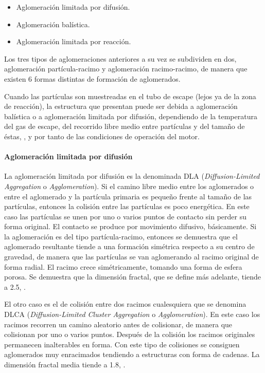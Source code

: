 \begin{itemize}
	\item Aglomeración limitada por difusión.
	\item Aglomeración balística.
	\item Aglomeración limitada por reacción.
\end{itemize}

\par Los tres tipos de aglomeraciones anteriores a su vez se subdividen en dos, aglomeración partícula-racimo y aglomeración racimo-racimo, de manera que existen 6 formas distintas de formación de aglomerados.

\par Cuando las partículas son muestreadas en el tubo de escape (lejos ya de la zona de reacción), la estructura que presentan puede ser debida a aglomeración balística o a aglomeración limitada por difusión, dependiendo de la temperatura del gas de escape, del recorrido libre medio entre partículas y del tamaño de éstas, \cite{skillasetal:1998}, y por tanto de las condiciones de operación del motor.

\paragraph{Aglomeración limitada por difusión} \label{paragrah:Aglomeracionlimitadadifusion}

\par La aglomeración limitada por difusión es la denominada DLA (\textit{Diffusion-Limited Aggregation} o \textit{Agglomeration}). Si el camino libre medio entre los aglomerados o entre el aglomerado y la partícula primaria es pequeño frente al tamaño de las partículas, entonces la colisión entre las partículas es poco energética. En este caso las partículas se unen por uno o varios puntos de contacto sin perder su forma original. El contacto se produce por movimiento difusivo, básicamente. Si la aglomeración es del tipo partícula-racimo, entonces se demuestra que el aglomerado resultante tiende a una formación simétrica respecto a su centro de gravedad, de manera que las partículas se van aglomerando al racimo original de forma radial. El racimo crece simétricamente, tomando una forma de esfera porosa. Se demuestra que la dimensión fractal, que se define más adelante, tiende a 2.5, \cite{friedlander:2000}. 

\par El otro caso es el de colisión entre dos racimos cualesquiera que se denomina DLCA (\textit{Diffusion-Limited Cluster Aggregation} o \textit{Agglomeration}). En este caso los racimos recorren un camino aleatorio antes de colisionar, de manera que colisionan por uno o varios puntos. Después de la colisión los racimos originales permanecen inalterables en forma. Con este tipo de colisiones se consiguen aglomerados muy enracimados tendiendo a estructuras con forma de cadenas. La dimensión fractal media tiende a 1.8, \cite{megaridisetal:1990}.

